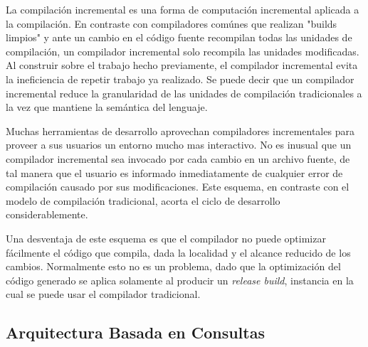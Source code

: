 \documentclass[12pt, a4paper]{report}
\begin{document}
La compilación incremental es una forma de computación incremental aplicada a la compilación.
En contraste con compiladores comúnes que realizan "builds limpios" y ante un cambio en el código fuente recompilan todas las unidades de compilación, un compilador incremental solo recompila las unidades modificadas.
Al construir sobre el trabajo hecho previamente, el compilador incremental evita la ineficiencia de repetir trabajo ya realizado.
Se puede decir que un compilador incremental reduce la granularidad de las unidades de compilación tradicionales a la vez que mantiene la semántica del lenguaje.

Muchas herramientas de desarrollo aprovechan compiladores incrementales para proveer a sus usuarios un entorno mucho mas interactivo.
No es inusual que un compilador incremental sea invocado por cada cambio en un archivo fuente, de tal manera que el usuario es informado inmediatamente de cualquier error de compilación causado por sus modificaciones.
Este esquema, en contraste con el modelo de compilación tradicional, acorta el ciclo de desarrollo considerablemente.

Una desventaja de este esquema es que el compilador no puede optimizar fácilmente el código que compila, dada la localidad y el alcance reducido de los cambios.
Normalmente esto no es un problema, dado que la optimización del código generado se aplica solamente al producir un \textit{release build}, instancia en la cual se puede usar el compilador tradicional.

\subsection*{Arquitectura Basada en Consultas}
\end{document}
